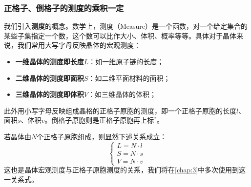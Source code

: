 \subsubsection{正格子、倒格子的测度的乘积一定}
    我们引入\textbf{测度}的概念。数学上，测度（Measure）是一个函数，对一个给定集合的某些子集指定一个数，这个数可以比作大小、体积、概率等等。具体对于晶体来说，我们常用大写字母反映晶体的宏观测度：
    \begin{itemize}[itemsep=0pt,parsep=0pt]
        \item \textbf{一维晶体的测度即长度$L$}：如一维原子链的长度；
        \item \textbf{二维晶体的测度即面积$S$}：如二维平面材料的面积；
        \item \textbf{三维晶体的测度即体积$V$}：如三维晶体的体积；
    \end{itemize}
    此外用小写字母反映组成晶格的正格子原胞的测度，即一个正格子原胞的长度$l$、面积$s$、体积$v$。倒格子原胞则是正格子原胞再上标$^\ast$。

    若晶体由$N$个正格子原胞组成，则显然下述关系成立：
    \begin{equation}\label{eq:2.11}
    \begin{cases}
        L = N\cdot l\\
        S = N\cdot s\\
        V = N\cdot v
    \end{cases}
    \end{equation}
    这也是晶体宏观测度与正格子原胞测度的关系，我们将在\autoref{chap:3}中多次使用到这一关系式。


